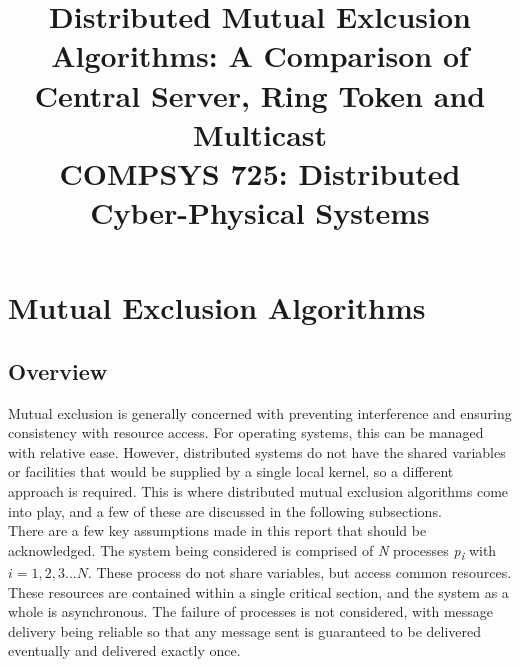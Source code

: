 \documentclass[conference]{IEEEtran}
\begin{document}
\title{Distributed Mutual Exlcusion Algorithms: A Comparison of Central Server,
Ring Token and Multicast\\
{\footnotesize COMPSYS 725: Distributed Cyber-Physical Systems}
}

\author{
}

\maketitle



\section{Mutual Exclusion Algorithms}
\subsection{Overview}
Mutual exclusion is generally concerned with preventing interference and
ensuring consistency with resource access. For operating systems, this can be
managed with relative ease. However, distributed systems do not have the
shared variables or facilities that would be supplied by a single local kernel,
so a different approach is required. This is where distributed mutual exclusion
algorithms come into play, and a few of these are discussed in the following
subsections. \\
There are a few key assumptions made in this report that should be
acknowledged. The system being considered is comprised of \textit{N} processes
\textit{p\textsubscript{i}} with $i=1,2,3... N$. These process do not share
variables, but access common resources. These resources are contained within
a single critical section, and the system as a whole is asynchronous. The
failure of processes is not considered, with message delivery being reliable so
that any message sent is guaranteed to be delivered eventually and delivered
exactly once. 
\end{document}
